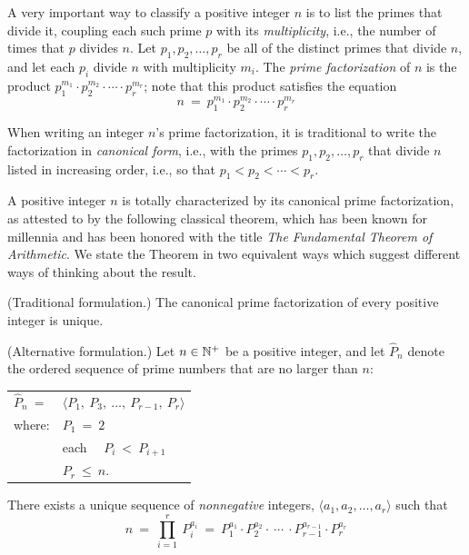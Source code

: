 A very important way to classify a positive integer $n$ is to list the
primes that divide it, coupling each such prime $p$ with its {\it
  multiplicity}, i.e., the number of times that $p$ divides $n$.  Let
$p_1, p_2, \ldots, p_r$ be all of the distinct primes that divide $n$,
and let each $p_i$ divide $n$ with multiplicity $m_i$.  The {\it prime
  factorization}
%
of $n$ is the product $p_1^{m_1} \cdot p_2^{m_2} \cdot \cdots \cdot
p_r^{m_r}$; note that this product satisfies the equation
\begin{equation}
\label{eq:prime-factorization}
n \ = \ p_1^{m_1} \cdot p_2^{m_2} \cdot \cdots \cdot p_r^{m_r}
\end{equation}

When writing an integer $n$'s prime factorization, it is traditional
to write the factorization in {\it canonical form},
i.e., with the primes $p_1, p_2, \ldots, p_r$ that divide $n$ listed
in increasing order, i.e., so that $p_1 < p_2 < \cdots < p_r$.

\noindent
A positive integer $n$ is totally characterized by its canonical prime
factorization, as attested to by the following classical theorem,
which has been known for millennia and has been honored with the title
{\em The Fundamental Theorem of Arithmetic}.
We state the Theorem in two equivalent ways which suggest different
ways of thinking about the result.

\begin{theorem}
\label{thm:Fund-Thm-Arith}

\noindent
{\rm (Traditional formulation.)}
%
The canonical prime factorization of every positive integer is unique.

\noindent
{\rm (Alternative formulation.)}
%
Let $n \in \mathbb{N}^+$ be a positive integer, and let $\widehat{P}_n$ denote the
ordered sequence of prime numbers that are no larger than $n$:

\begin{tabular}{ll}
$\widehat{P}_n \ =$  & $\langle P_1, \ P_3, \ \ldots, \ P_{r-1}, \ P_r \rangle$ \\
where:               & $P_1 \ = \ 2$ \\
                     & each  \ \ $P_i \ < \ P_{i+1}$ \\
                     & $P_r \ \leq \ n$.
\end{tabular}

\noindent
There exists a unique sequence of {\em nonnegative} integers, 
$\langle a_1, a_2, \ldots, a_r \rangle$
such that
\[
n \ = \ \prod_{i=1}^r \ P_i^{a_i} \ = \
P_1^{a_1} \cdot P_2^{a_2} \cdot \ \cdots \ \cdot P_{r-1}^{a_{r-1}} \cdot P_r^{a_r}
\]
\end{theorem}

